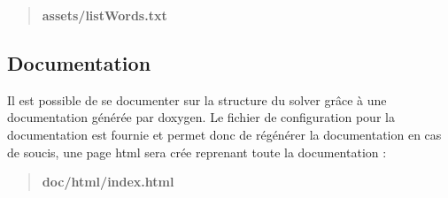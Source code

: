 \begin{quotation}
{\bfseries assets/list\-Words.\-txt}

\end{quotation}


\subsection*{Documentation}

Il est possible de se documenter sur la structure du solver grâce à une documentation générée par doxygen. Le fichier de configuration pour la documentation est fournie et permet donc de régénérer la documentation en cas de soucis, une page html sera crée reprenant toute la documentation \-:

\begin{quotation}
{\bfseries doc/html/index.\-html} \end{quotation}
